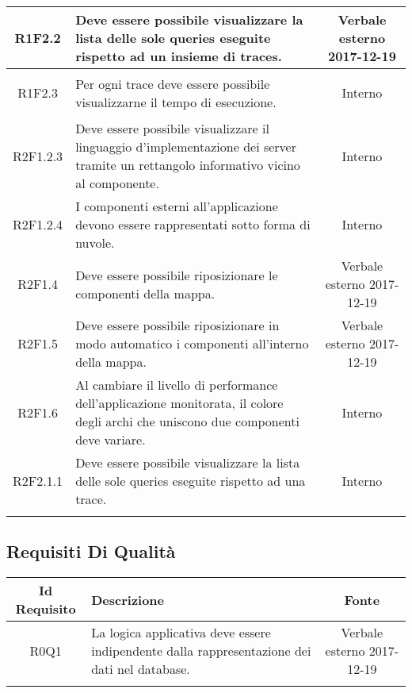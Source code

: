 \begin{longtable}{|c|>{\centering}m{7cm}|c|}
\hypertarget{R1F2.2}{R1F2.2} & Deve essere possibile visualizzare la lista delle sole queries eseguite rispetto ad un insieme di traces. & Verbale esterno 2017-12-19 \\ \hline 
\hypertarget{R1F2.3}{R1F2.3} & Per ogni trace deve essere possibile visualizzarne il tempo di esecuzione. & Interno \\ \hline 
\hypertarget{R2F1.2.3}{R2F1.2.3} & Deve essere possibile visualizzare il linguaggio d'implementazione dei server tramite un rettangolo informativo vicino al componente. & Interno \\ \hline 
\hypertarget{R2F1.2.4}{R2F1.2.4} & I componenti esterni all'applicazione devono essere rappresentati sotto forma di nuvole. & Interno \\ \hline 
\hypertarget{R2F1.4}{R2F1.4} & Deve essere possibile riposizionare le componenti della mappa. & Verbale esterno 2017-12-19 \\ \hline 
\hypertarget{R2F1.5}{R2F1.5} & Deve essere possibile riposizionare in modo automatico i componenti all'interno della mappa. & Verbale esterno 2017-12-19 \\ \hline 
\hypertarget{R2F1.6}{R2F1.6} & Al cambiare il livello di performance dell'applicazione monitorata, il colore degli archi che uniscono due componenti deve variare. & Interno \\ \hline 
\hypertarget{R2F2.1.1}{R2F2.1.1} & Deve essere possibile visualizzare la lista delle sole queries eseguite rispetto ad una trace. & Interno \\ \hline 
\caption[Requisiti Funzionali]{Requisiti Funzionali
\label{tabella:req0}
\end{longtable}
\clearpage
\subsection{Requisiti Di Qualità}
\normalsize
\begin{longtable}{|c|>{\centering}m{7cm}|c|}
\hline
\textbf{Id Requisito} & \textbf{Descrizione} & \textbf{Fonte}\\
\hline
\endhead
\hypertarget{R0Q1}{R0Q1} & La logica applicativa deve essere indipendente dalla rappresentazione dei dati nel database. & Verbale esterno 2017-12-19 \\ \hline 
\caption[Requisiti Di Qualità]{Requisiti Di Qualità
\label{tabella:req1}
\end{longtable}
\clearpage
